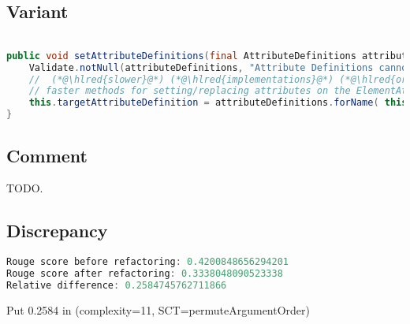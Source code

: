 \documentclass[11pt]{article}
\DeclareRobustCommand{\hlred}[1]{{\sethlcolor{YellowOrange}\hl{#1}}}
\begin{document}
\subsection{Variant}

\begin{lstlisting}[language=java]

public void setAttributeDefinitions(final AttributeDefinitions attributeDefinitions) {
    Validate.notNull(attributeDefinitions, "Attribute Definitions cannot be null");
    //  (*@\hlred{slower}@*) (*@\hlred{implementations}@*) (*@\hlred{or}@*) (*@\hlred{also}@*) (*@\hlred{other}@*) (*@\hlred{slower}@*) (*@\hlred{or}@*) (*@\hlred{equivalent}@*) (*@\hlred{methods}@*) (*@\hlred{are}@*) (*@\hlred{encouraged}@*) (*@\hlred{and}@*) (*@\hlred{can}@*) (*@\hlred{instead}@*) (*@\hlred{invoke}@*) (*@\hlred{only}@*)
    // faster methods for setting/replacing attributes on the ElementAttributes implementation
    this.targetAttributeDefinition = attributeDefinitions.forName( this.targetAttrCompleteName(*@\hlred{,getTemplateMode(}@*))(*@\hlred{)}@*);
}
\end{lstlisting}

\subsection{Comment}

TODO.

\subsection{Discrepancy}

\begin{lstlisting}[language=java]
Rouge score before refactoring: 0.4200848656294201
Rouge score after refactoring: 0.3338048090523338
Relative difference: 0.2584745762711866
\end{lstlisting}

Put 0.2584 in (complexity=11, SCT=permuteArgumentOrder)
\end{document}
